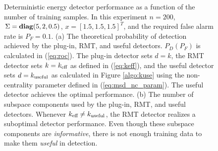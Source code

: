 \begin{figure}[t]
\centering
{}
\caption{Deterministic energy detector performance as a function of the number of training
  samples. In this experiment $n=200$, $\Sigma =\mathop{\bf diag}(5,2,0.5)$, $x=[1.5,1.5,1.5]^T$, and
  the required false alarm rate is $P_F=0.1$. (a) The theoretical probability of detection
  achieved by the plug-in, RMT, and useful detectors. $P_D(P_F)$ is calculated in
  (\ref{eq:roc}). The plug-in detector sets $d=k$, the RMT detector sets $k=k_\text{eff}$ as
  defined in (\ref{eq:keff}), and the useful detector sets $d=k_{\text{useful}}$ as calculated in
  Figure \ref{algo:kuse} using the non-centrality parameter defined in
  (\ref{eq:msd_nc_param}). The useful detector achieves the optimal performance. (b) The
  number of subspace components used by the plug-in, RMT, and useful detectors. Whenever
  $k_\text{eff}\neq k_{\text{useful}}$, the RMT detector realizes a suboptimal detector performance. Even
  though these subspace components are \textit{informative}, there is not enough training
  data to make them \textit{useful} in detection.}
\label{fig:main_result}
\end{figure}

